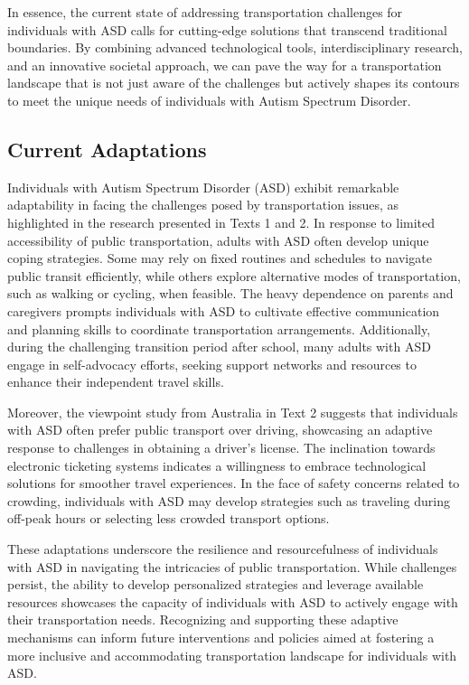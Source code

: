     In essence, the current state of addressing transportation challenges for individuals with ASD calls for cutting-edge solutions that transcend traditional boundaries. By combining advanced technological tools, interdisciplinary research, and an innovative societal approach, we can pave the way for a transportation landscape that is not just aware of the challenges but actively shapes its contours to meet the unique needs of individuals with Autism Spectrum Disorder.

\subsection{Current Adaptations}

   Individuals with Autism Spectrum Disorder (ASD) exhibit remarkable adaptability in facing the challenges posed by transportation issues, as highlighted in the research presented in Texts 1 and 2. In response to limited accessibility of public transportation, adults with ASD often develop unique coping strategies. Some may rely on fixed routines and schedules to navigate public transit efficiently, while others explore alternative modes of transportation, such as walking or cycling, when feasible. The heavy dependence on parents and caregivers prompts individuals with ASD to cultivate effective communication and planning skills to coordinate transportation arrangements. Additionally, during the challenging transition period after school, many adults with ASD engage in self-advocacy efforts, seeking support networks and resources to enhance their independent travel skills.

    Moreover, the viewpoint study from Australia in Text 2 suggests that individuals with ASD often prefer public transport over driving, showcasing an adaptive response to challenges in obtaining a driver's license. The inclination towards electronic ticketing systems indicates a willingness to embrace technological solutions for smoother travel experiences. In the face of safety concerns related to crowding, individuals with ASD may develop strategies such as traveling during off-peak hours or selecting less crowded transport options.
    
    These adaptations underscore the resilience and resourcefulness of individuals with ASD in navigating the intricacies of public transportation. While challenges persist, the ability to develop personalized strategies and leverage available resources showcases the capacity of individuals with ASD to actively engage with their transportation needs. Recognizing and supporting these adaptive mechanisms can inform future interventions and policies aimed at fostering a more inclusive and accommodating transportation landscape for individuals with ASD.

